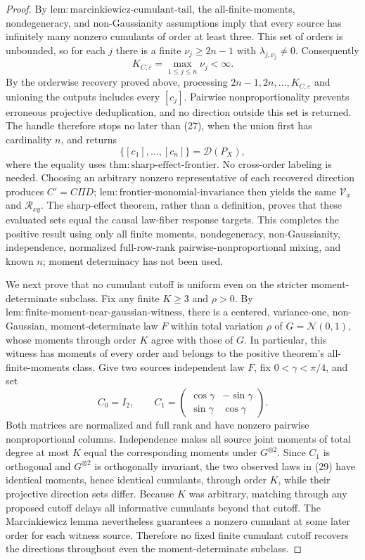 \documentclass{article}
\begin{document}
\begin{proof}
By \(\mathrm{lem{:}marcinkiewicz\text{-}cumulant\text{-}tail}\), the all-finite-moments, nondegeneracy, and non-Gaussianity assumptions imply that every source has infinitely many nonzero cumulants of order at least three. This set of orders is unbounded, so for each \(j\) there is a finite \(\nu_j\ge2n-1\) with \(\lambda_{j,\nu_j}\ne0\). Consequently
\[
 K_{C,\varepsilon}=\max_{1\le j\le n}\nu_j<\infty. \tag{27}
\]
By the orderwise recovery proved above, processing \(2n-1,2n,\ldots,K_{C,\varepsilon}\) and unioning the outputs includes every \([c_j]\). Pairwise nonproportionality prevents erroneous projective deduplication, and no direction outside this set is returned. The handle therefore stops no later than (27), when the union first has cardinality \(n\), and returns
\[
 \{[c_1],\ldots,[c_n]\}=\mathcal D(P_X), \tag{28}
\]
where the equality uses \(\mathrm{thm{:}sharp\text{-}effect\text{-}frontier}\). No cross-order labeling is needed. Choosing an arbitrary nonzero representative of each recovered direction produces \(C'=C\Pi D\); \(\mathrm{lem{:}frontier\text{-}monomial\text{-}invariance}\) then yields the same \(\mathcal V_x\) and \(\mathcal R_{xy}\). The sharp-effect theorem, rather than a definition, proves that these evaluated sets equal the causal law-fiber response targets. This completes the positive result using only all finite moments, nondegeneracy, non-Gaussianity, independence, normalized full-row-rank pairwise-nonproportional mixing, and known \(n\); moment determinacy has not been used.

We next prove that no cumulant cutoff is uniform even on the stricter moment-determinate subclass. Fix any finite \(K\ge3\) and \(\rho>0\). By \(\mathrm{lem{:}finite\text{-}moment\text{-}near\text{-}gaussian\text{-}witness}\), there is a centered, variance-one, non-Gaussian, moment-determinate law \(F\) within total variation \(\rho\) of \(G=\mathcal N(0,1)\), whose moments through order \(K\) agree with those of \(G\). In particular, this witness has moments of every order and belongs to the positive theorem's all-finite-moments class. Give two sources independent law \(F\), fix \(0<\gamma<\pi/4\), and set
\[
 C_0=I_2,
 \qquad
 C_1=
 \begin{pmatrix}
 \cos\gamma&-\sin\gamma\\
 \sin\gamma&\cos\gamma
 \end{pmatrix}. \tag{29}
\]
Both matrices are normalized and full rank and have nonzero pairwise nonproportional columns. Independence makes all source joint moments of total degree at most \(K\) equal the corresponding moments under \(G^{\otimes2}\). Since \(C_1\) is orthogonal and \(G^{\otimes2}\) is orthogonally invariant, the two observed laws in (29) have identical moments, hence identical cumulants, through order \(K\), while their projective direction sets differ. Because \(K\) was arbitrary, matching through any proposed cutoff delays all informative cumulants beyond that cutoff. The Marcinkiewicz lemma nevertheless guarantees a nonzero cumulant at some later order for each witness source. Therefore no fixed finite cumulant cutoff recovers the directions throughout even the moment-determinate subclass.


\end{proof}
\end{document}
